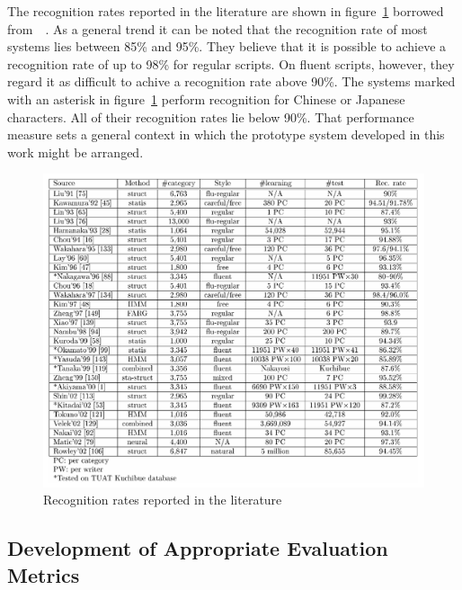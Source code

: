 The recognition rates reported in the literature are shown in 
figure~\ref{fig:recognitionratesreported} borrowed 
from~~\citeyear{LiuJaegerNakagawa2004}.
As a general trend it can be noted that the recognition rate of most systems
lies between 85\% and 95\%. They believe that it is possible to achieve a 
recognition rate of up to 98\% for regular scripts. On fluent scripts, however,
they regard it as difficult to achive a recognition rate above 90\%.
The systems marked with an asterisk in figure~\ref{fig:recognitionratesreported}
perform recognition for Chinese or Japanese characters. All of their recognition
rates lie below 90\%. That performance measure sets a general context in which 
the prototype system developed in this work might be arranged.
\begin{figure}[htbp]
  \begin{center}
    \includegraphics[scale=0.6]{images/recognitionRatesLiuJaeger.png}
    \caption{Recognition rates reported in the literature}
    \label{fig:recognitionratesreported}
  \end{center}
\end{figure}

\subsection{Development of Appropriate Evaluation Metrics}
\label{sec:eval:developmentofevalmetrics}


